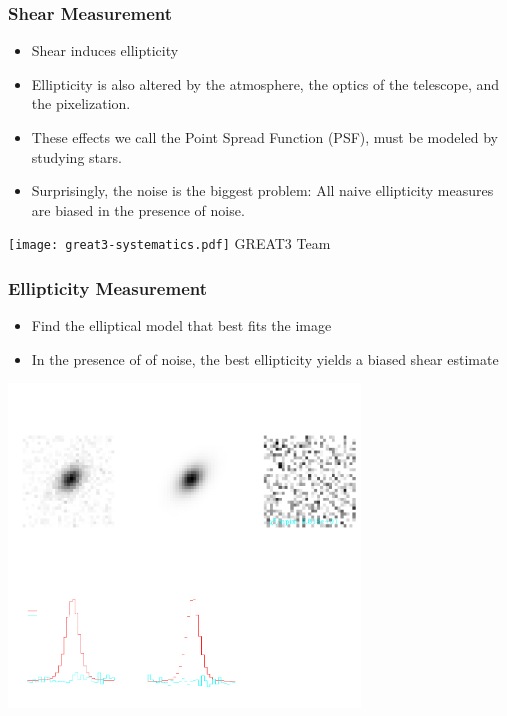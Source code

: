 \documentclass{beamer}
\begin{document}
\frame
{
    \frametitle{Shear Measurement}

    \begin{itemize}

        \item Shear induces ellipticity

        \item Ellipticity is also altered by the atmosphere, the optics
            of the telescope, and the pixelization.
        
        \item These effects we call the Point Spread Function (PSF),
            must be modeled by studying stars.

        \item Surprisingly, the noise is the biggest problem:  All
            naive ellipticity measures are biased in the presence of
            noise.

    \end{itemize}
    \begin{center}
        \texttt{[image: great3-systematics.pdf]}
        \newline
        {\tiny GREAT3 Team}
    \end{center}
}


\frame
{
    \frametitle{Ellipticity Measurement}

    \begin{itemize}

        \item Find the elliptical model that best fits the image

        \item In the presence of of noise, the best
            ellipticity yields a biased shear estimate

    \end{itemize}
    \begin{center}


        \includegraphics[trim=0 0 0 50,clip,width=0.7\textwidth]{example-fit-hi-s2n-invert.pdf}
    \end{center}
}
\end{document}
